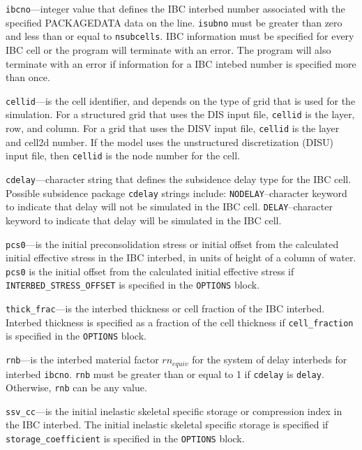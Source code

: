 \begin{description}
\item \texttt{ibcno}---integer value that defines the IBC interbed number associated with the specified PACKAGEDATA data on the line. \texttt{isubno} must be greater than zero and less than or equal to \texttt{nsubcells}.  IBC information must be specified for every IBC cell or the program will terminate with an error.  The program will also terminate with an error if information for a IBC intebed number is specified more than once.

\item \texttt{cellid}---is the cell identifier, and depends on the type of grid that is used for the simulation.  For a structured grid that uses the DIS input file, \texttt{cellid} is the layer, row, and column.   For a grid that uses the DISV input file, \texttt{cellid} is the layer and cell2d number.  If the model uses the unstructured discretization (DISU) input file, then \texttt{cellid} is the node number for the cell.

\item \texttt{cdelay}---character string that defines the subsidence delay type for the IBC cell. Possible subsidence package \texttt{cdelay} strings include: \texttt{NODELAY}--character keyword to indicate that delay will not be simulated in the IBC cell.  \texttt{DELAY}--character keyword to indicate that delay will be simulated in the IBC cell.

\item \texttt{pcs0}---is the initial preconsolidation stress or initial offset from the calculated initial effective stress in the IBC interbed, in units of height of a column of water. \texttt{pcs0} is the initial offset from the calculated initial effective stress if \texttt{INTERBED\_STRESS\_OFFSET} is specified in the \texttt{OPTIONS} block.

\item \texttt{thick\_frac}---is the interbed thickness or cell fraction of the IBC interbed. Interbed thickness is specified as a fraction of the cell thickness if \texttt{cell\_fraction} is specified in the \texttt{OPTIONS} block.

\item \texttt{rnb}---is the interbed material factor $rn_{equiv}$ for the system of delay interbeds for interbed \texttt{ibcno}. \texttt{rnb} must be greater than or equal to 1 if \texttt{cdelay} is \texttt{delay}. Otherwise, \texttt{rnb} can be any value.

\item \texttt{ssv\_cc}---is the initial inelastic skeletal specific storage or compression index in the IBC interbed. The initial inelastic skeletal specific storage is specified if \texttt{storage\_coefficient} is specified in the \texttt{OPTIONS} block.


\end{description}
